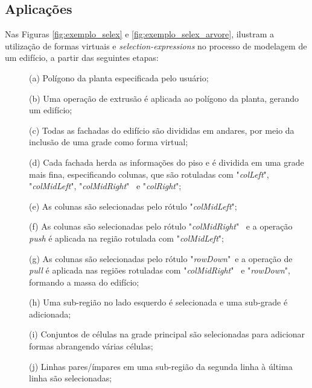 \subsection{Aplicações}
\label{sec:selex_modelagem}

Nas Figuras \ref{fig:exemplo_selex} e \ref{fig:exemplo_selex_arvore},  ilustram a utilização de formas virtuais e \textit{selection-expressions} no processo de modelagem de um edifício, a partir das seguintes etapas:

\begin{description}
    \item[] \; (a) Polígono da planta especificada pelo usuário;
    
    \item[] \; (b) Uma operação de extrusão é aplicada ao polígono da planta, gerando um edifício;
    
    \item[] \; (c) Todas as fachadas do edifício são divididas em andares, por meio da inclusão de uma grade como forma virtual;
    
    \item[] \; (d) Cada fachada herda as informações do piso e é dividida em uma grade mais fina, especificando colunas, que são rotuladas com "\textit{colLeft}", "\textit{colMidLeft}", "\textit{colMidRight}" \, e "\textit{colRight}";
    
    \item[] \; (e) As colunas são selecionadas pelo rótulo "\textit{colMidLeft}";
    
    \item[] \; (f) As colunas são selecionadas pelo rótulo "\textit{colMidRight}" \, e a operação \textit{push} é aplicada na região rotulada com "\textit{colMidLeft}";
    
    \item[] \; (g) As colunas são selecionadas pelo rótulo "\textit{rowDown}" \,e a operação de \textit{pull} é aplicada nas regiões rotuladas com "\textit{colMidRight}" \, e "\textit{rowDown}", formando a massa do edifício;
    
    \item[] \; (h) Uma sub-região no lado esquerdo é selecionada e uma sub-grade é adicionada;
    
    \item[] \; (i) Conjuntos de células na grade principal são selecionadas para adicionar formas abrangendo várias células;
    
    \item[] \; (j) Linhas pares/ímpares em uma sub-região da segunda linha à última linha são selecionadas;
    

\end{description}
